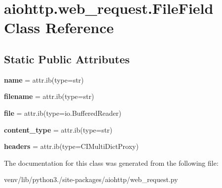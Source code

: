 \hypertarget{classaiohttp_1_1web__request_1_1_file_field}{}\section{aiohttp.\+web\+\_\+request.\+File\+Field Class Reference}
\label{classaiohttp_1_1web__request_1_1_file_field}
\subsection*{Static Public Attributes}
\begin{DoxyCompactItemize}
\item 
\mbox{\label{classaiohttp_1_1web__request_1_1_file_field_a6868685075ac7359154131b8b43ff139}} 
{\bfseries name} = attr.\+ib(type=str)
\item 
\mbox{\label{classaiohttp_1_1web__request_1_1_file_field_aaad0c196fec2ec7eeab618a7143f2db9}} 
{\bfseries filename} = attr.\+ib(type=str)
\item 
\mbox{\label{classaiohttp_1_1web__request_1_1_file_field_a7d18f937ba54a97dd5b779a8aa1bee66}} 
{\bfseries file} = attr.\+ib(type=io.\+Buffered\+Reader)
\item 
\mbox{\label{classaiohttp_1_1web__request_1_1_file_field_abbdd76f57c994e39c09fa05f88b7ca35}} 
{\bfseries content\+\_\+type} = attr.\+ib(type=str)
\item 
\mbox{\label{classaiohttp_1_1web__request_1_1_file_field_a1897dbd361fdfdd55cf69967e2ac7e6b}} 
{\bfseries headers} = attr.\+ib(type=C\+I\+Multi\+Dict\+Proxy)
\end{DoxyCompactItemize}


The documentation for this class was generated from the following file\+:\begin{DoxyCompactItemize}
\item 
venv/lib/python3./site-\/packages/aiohttp/web\+\_\+request.\+py\end{DoxyCompactItemize}
